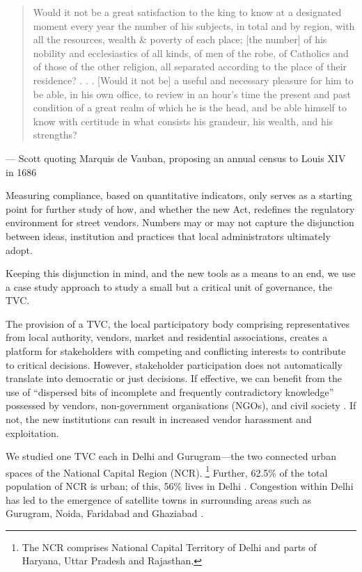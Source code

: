 \documentclass[a4paper, 12pt, twoside]{article}
\begin{document}
{\begin{quote}
Would it not be a great satisfaction to the king to know at a designated moment every year the number of his subjects, in total and by region, with all the resources, wealth \& poverty of each place; [the number] of his nobility and ecclesiastics of all kinds, of men of the robe, of Catholics and of those of the other religion, all separated according to the place of their residence? . . . [Would it not be] a useful and necessary pleasure for him to be able, in his own office, to review in an hour’s time the present and past condition of a great realm of which he is the head, and be able himself to know with certitude in what consists his grandeur, his wealth, and his strengths?
\end{quote}
— Scott \cite*{scottbook} quoting Marquis de Vauban, proposing an annual census to Louis XIV in 1686

Measuring compliance, based on quantitative indicators, only serves as a starting point for further study of how, and whether the new Act, redefines the regulatory environment for street vendors. Numbers may or may not capture the disjunction between ideas, institution and practices that local administrators ultimately adopt.

Keeping this disjunction in mind, and the new tools as a means to an end, we use a case study approach to study a small but a critical unit of governance, the TVC.

The provision of a TVC, the local participatory body comprising representatives from local authority, vendors, market and residential associations, creates a platform for stakeholders with competing and conflicting interests to contribute to critical decisions. However, stakeholder participation does not automatically translate into democratic or just decisions. If effective, we can benefit from the use of “dispersed bits of incomplete and frequently contradictory knowledge” possessed by vendors, non-government organisations (NGOs), and civil society \parencite{hayekpaper}. If not, the new institutions can result in increased vendor harassment and exploitation.

We studied one TVC each in Delhi and Gurugram—the two connected urban spaces of the National Capital Region (NCR). \footnote{The NCR comprises National Capital Territory of Delhi and parts of Haryana, Uttar Pradesh and Rajasthan.} Further, 62.5\% of the total population of NCR is urban; of this, 56\% lives in Delhi \parencite{ncrpbreport}. Congestion within Delhi has led to the emergence of satellite towns in surrounding areas such as Gurugram, Noida, Faridabad and Ghaziabad \parencite{kpmgreport}.

}
\end{document}

